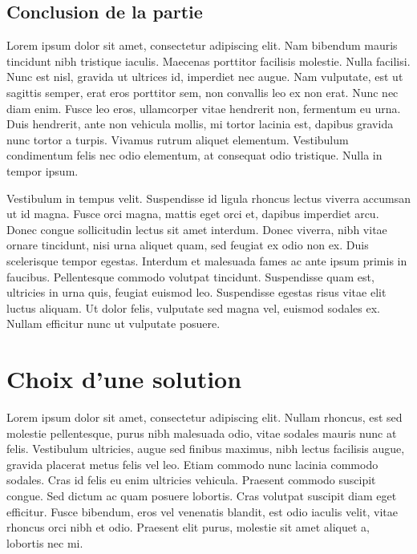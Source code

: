 \documentclass[a4paper,12pt]{report}
\begin{document}
\subsection{Conclusion de la partie} %
Lorem ipsum dolor sit amet, consectetur adipiscing elit. Nam bibendum mauris tincidunt nibh tristique iaculis. Maecenas porttitor facilisis molestie. Nulla facilisi. Nunc est nisl, gravida ut ultrices id, imperdiet nec augue. Nam vulputate, est ut sagittis semper, erat eros porttitor sem, non convallis leo ex non erat. Nunc nec diam enim. Fusce leo eros, ullamcorper vitae hendrerit non, fermentum eu urna. Duis hendrerit, ante non vehicula mollis, mi tortor lacinia est, dapibus gravida nunc tortor a turpis. Vivamus rutrum aliquet elementum. Vestibulum condimentum felis nec odio elementum, at consequat odio tristique. Nulla in tempor ipsum.

Vestibulum in tempus velit. Suspendisse id ligula rhoncus lectus viverra accumsan ut id magna. Fusce orci magna, mattis eget orci et, dapibus imperdiet arcu. Donec congue sollicitudin lectus sit amet interdum. Donec viverra, nibh vitae ornare tincidunt, nisi urna aliquet quam, sed feugiat ex odio non ex. Duis scelerisque tempor egestas. Interdum et malesuada fames ac ante ipsum primis in faucibus. Pellentesque commodo volutpat tincidunt. Suspendisse quam est, ultricies in urna quis, feugiat euismod leo. Suspendisse egestas risus vitae elit luctus aliquam. Ut dolor felis, vulputate sed magna vel, euismod sodales ex. Nullam efficitur nunc ut vulputate posuere.

\section{Choix d'une solution} %
Lorem ipsum dolor sit amet, consectetur adipiscing elit. Nullam rhoncus, est sed molestie pellentesque, purus nibh malesuada odio, vitae sodales mauris nunc at felis. Vestibulum ultricies, augue sed finibus maximus, nibh lectus facilisis augue, gravida placerat metus felis vel leo. Etiam commodo nunc lacinia commodo sodales. Cras id felis eu enim ultricies vehicula. Praesent commodo suscipit congue. Sed dictum ac quam posuere lobortis. Cras volutpat suscipit diam eget efficitur. Fusce bibendum, eros vel venenatis blandit, est odio iaculis velit, vitae rhoncus orci nibh et odio. Praesent elit purus, molestie sit amet aliquet a, lobortis nec mi.
\end{document}
